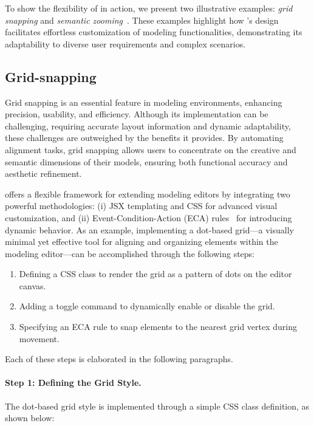 To show the flexibility of \jjodel{} in action, we present two illustrative examples: \textit{grid snapping} and \textit{semantic zooming}~\cite{frisch2008towards}. These examples highlight how \jjodel{}'s design facilitates effortless customization of modeling functionalities, demonstrating its adaptability to diverse user requirements and complex scenarios.

\subsection{Grid-snapping}\label{grid-snapping}

Grid snapping is an essential feature in modeling environments, enhancing precision, usability, and efficiency. Although its implementation can be challenging, requiring accurate layout information and dynamic adaptability, these challenges are outweighed by the benefits it provides. By automating alignment tasks, grid snapping allows users to concentrate on the creative and semantic dimensions of their models, ensuring both functional accuracy and aesthetic refinement.

\jjodel{} offers a flexible framework for extending modeling editors by integrating two powerful methodologies: (i) JSX templating and CSS for advanced visual customization, and (ii) Event-Condition-Action (ECA) rules~\cite{widom1995active} for introducing dynamic behavior. As an example, implementing a dot-based grid—a visually minimal yet effective tool for aligning and organizing elements within the modeling editor—can be accomplished through the following steps: 

\begin{enumerate}
\item Defining a CSS class to render the grid as a pattern of dots on the editor canvas.  
\item Adding a toggle command to dynamically enable or disable the grid.  
\item Specifying an ECA rule to snap elements to the nearest grid vertex during movement.  
\end{enumerate}

Each of these steps is elaborated in the following paragraphs.

\paragraph{Step 1: Defining the Grid Style.}

The dot-based grid style is implemented through a simple CSS class definition, as shown below:

